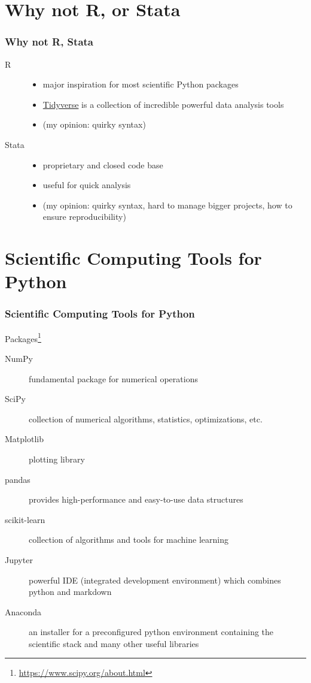 \section{Why not R, or Stata} %
\label{sec:why_not_r_stata}

\begin{frame}[c]\frametitle{Why not R, Stata}
\begin{description}
    \item[R]
    \begin{itemize}
        \item major inspiration for most scientific Python packages
        \item \href{https://www.tidyverse.org/}{Tidyverse} is a collection of incredible powerful data analysis tools
        \item (my opinion: quirky syntax)
    \end{itemize}
    \item[Stata]
    \begin{itemize}
        \item proprietary and closed code base
        \item useful for quick analysis
        \item (my opinion: quirky syntax, hard to manage bigger projects, how to ensure reproducibility)
    \end{itemize}
\end{description}
\end{frame}

\section{Scientific Computing Tools for Python} %
\label{sec:scientific_computing_tools_for_python}

\begin{frame}[c]\frametitle{Scientific Computing Tools for Python}
Packages\footnote{\url{https://www.scipy.org/about.html}}

\begin{description}
    \item[NumPy] fundamental package for numerical operations
    \item[SciPy] collection of numerical algorithms, statistics, optimizations, etc.
    \item[Matplotlib] plotting library
    \item[pandas] provides high-performance and easy-to-use data structures
    \item[scikit-learn] collection of algorithms and tools for machine learning
    \item[Jupyter] powerful IDE (integrated development environment) which combines python and markdown
    \item[Anaconda] an installer for a preconfigured python environment containing the scientific stack and many other useful libraries
\end{description}
\end{frame}


